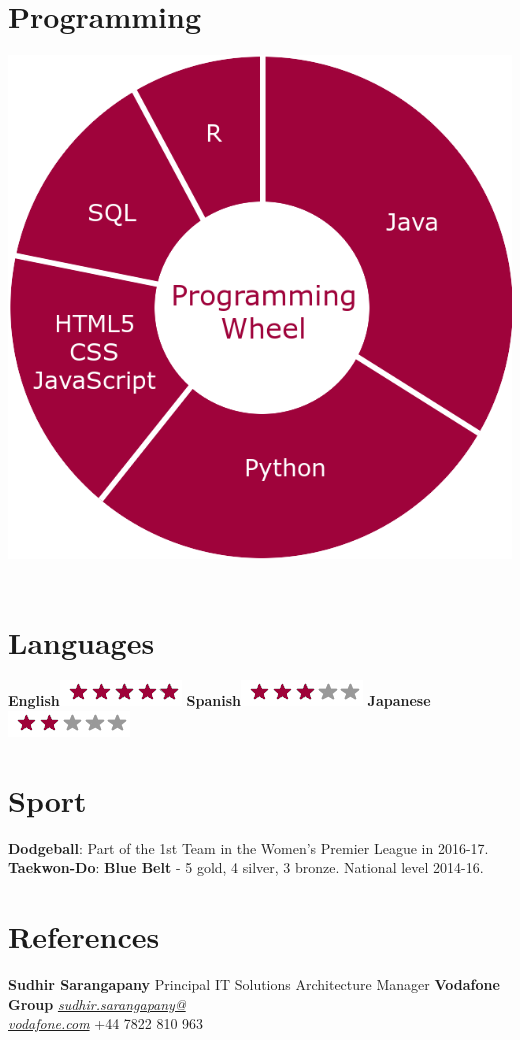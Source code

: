 \documentclass[]{friggeri-cv}
\begin{document}
\begin{aside}
    \section{Programming}
        \includegraphics[scale=0.15]{img/programmingwheel.png}
    ~

    \section{Languages}
        \textbf{English}\includegraphics[scale=0.40]{img/5stars.png}
        \textbf{Spanish}\includegraphics[scale=0.40]{img/3stars.png}
        \textbf{Japanese}\includegraphics[scale=0.40]{img/2stars.png}
    ~
    \section{Sport}
        \textbf{Dodgeball}:
        Part of the 1st Team in the Women's Premier League in 2016-17.
        \textbf{Taekwon-Do}:
        \textbf{Blue Belt} - 5 gold, 4 silver, 3 bronze.
        National level 2014-16.
    ~
    \section{References}
        \textbf{Sudhir Sarangapany}
        Principal IT Solutions Architecture Manager
        \textbf{Vodafone Group}
        \href{mailto:sudhir.sarangapany@vodafone.com}{\emph{sudhir.sarangapany@\\vodafone.com}}
        +44 7822 810 963
    ~
\end{aside}
\end{document}
